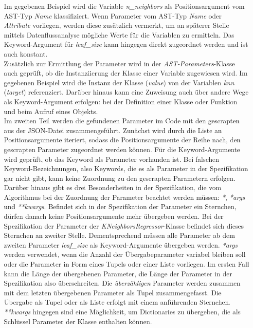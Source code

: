 \documentclass[german,bachelor]{swsLeipzig}
\begin{document}
Im gegebenen Beispiel wird die Variable \textit{n\_neighbors} als Positionsargument vom AST-Typ \textit{Name} klassifiziert.
Wenn Parameter vom AST-Typ \textit{Name} oder \textit{Attribute} vorliegen, werden diese zusätzlich vermerkt, um an späterer Stelle mittels
Datenflussanalyse mögliche Werte für die Variablen zu ermitteln.
Das Keyword-Argument für \textit{leaf\_size} kann hingegen direkt zugeordnet werden und ist auch konstant. \\

Zusätzlich zur Ermittlung der Parameter wird in der \textit{AST-Parameters}-Klasse auch geprüft, ob die Instanziierung der Klasse
einer Variable zugewiesen wird.
Im gegebenen Beispiel wird die Instanz der Klasse (\textit{value}) von der Variablen \textit{knn} (\textit{target}) referenziert.
Darüber hinaus kann eine Zuweisung auch über andere Wege als Keyword-Argument erfolgen:
bei der Definition einer Klasse oder Funktion und beim Aufruf eines Objekts.\\

Im zweiten Teil werden die gefundenen Parameter im Code mit den gescrapten aus der JSON-Datei zusammengeführt.
Zunächst wird durch die Liste an Positionsargumente iteriert, sodass die Positionsargumente der Reihe nach,
den gescrapten Parameter zugeordnet werden können.
Für die Keyword-Argumente wird geprüft, ob das Keyword als Parameter vorhanden ist.
Bei falschen Keyword-Bezeichnungen, also Keywords, die es als Parameter in der Spezifikation gar nicht gibt,
kann keine Zuordnung zu den gescrapten Parametern erfolgen. \\

Darüber hinaus gibt es drei Besonderheiten in der Spezifikation, die vom Algorithmus bei der Zuordnung der Parameter
beachtet werden müssen: \textit{*}, \textit{*args} und \textit{**kwargs}.
Befindet sich in der Spezifikation der Parameter ein Sternchen, dürfen danach keine Positionsargumente mehr
übergeben werden.
Bei der Spezifikation der Parameter der \textit{KNeighborsRegressor}-Klasse befindet sich dieses Sternchen an zweiter Stelle.
Dementsprechend müssen alle Parameter ab dem zweiten Parameter \textit{leaf\_size} als Keyword-Argumente übergeben werden.
\textit{*args} werden verwendet, wenn die Anzahl der Übergabeparameter variabel bleiben soll oder die Parameter in Form
eines Tupels oder einer Liste vorliegen.
Im ersten Fall kann die Länge der übergebenen Parameter, die Länge der Parameter in der Spezifikation also überschreiten.
Die \textit{überzähligen} Parameter werden zusammen mit dem letzten übergebenen Parameter als Tupel zusammengefasst.
Die Übergabe als Tupel oder als Liste erfolgt mit einem anführenden Sternchen.
\textit{**kwargs} hingegen sind eine Möglichkeit, um Dictionaries zu übergeben, die als Schlüssel Parameter der Klasse
enthalten können. \\
\end{document}

